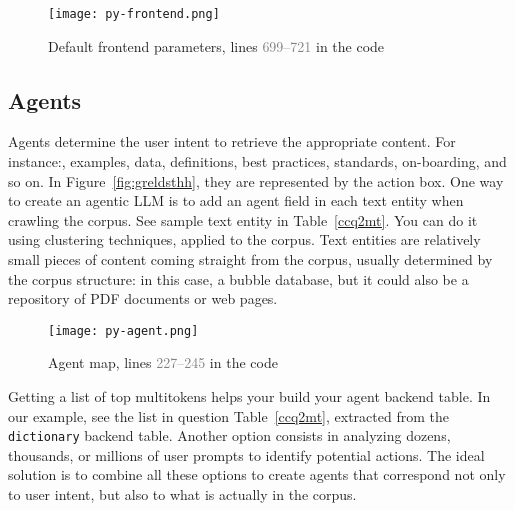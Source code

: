 \documentclass[10pt]{article}
\begin{document}
\begin{figure}[H]
\centering
\texttt{[image: py-frontend.png]}
\caption{Default frontend parameters, lines \textcolor{gray}{699--721} in the code}
\label{figs20nhghg87b}
\end{figure}

\subsection{Agents}\label{agents22}

\textcolor{index}{Agents} determine the user intent to retrieve the appropriate content. For instance:, examples, data, definitions, best practices, standards, on-boarding, and so on. 
In Figure~\ref{fig:greldsthh}, they are represented by the \textcolor{index}{action} box. One way to 
create an \textcolor{index}{agentic LLM} is to add an agent field in each 
\textcolor{index}{text entity} when crawling the corpus. See sample text entity
 in Table~\ref{ccq2mt}. You can do it using clustering techniques, applied to the corpus. Text entities
 are relatively small pieces of content coming straight from the corpus, usually determined by the corpus structure: in this case, a bubble database, but it could also be a repository of PDF documents or web pages.  

\begin{figure}[H]
\centering
\texttt{[image: py-agent.png]}
\caption{Agent map, lines \textcolor{gray}{227--245} in the code}
\label{figs20nhghg87b}
\end{figure}

Getting a list of top
 multitokens helps your build your agent backend table. In our example, see the list in question Table~\ref{ccq2mt},
 extracted from the \texttt{dictionary} backend table. Another option consists in analyzing dozens, thousands, or millions of user prompts to identify potential actions.
The ideal solution is to combine all these options to create agents that correspond not only to user intent, but also to
 what is actually in the corpus.
\end{document}
